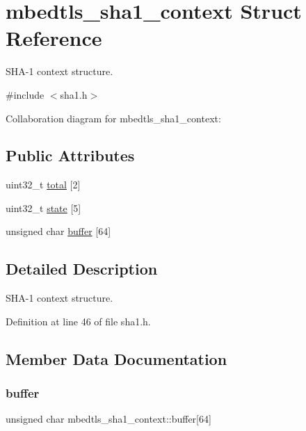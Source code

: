 \hypertarget{structmbedtls__sha1__context}{}\section{mbedtls\+\_\+sha1\+\_\+context Struct Reference}
\label{structmbedtls__sha1__context}


S\+H\+A-\/1 context structure.  




{\ttfamily \#include $<$sha1.\+h$>$}



Collaboration diagram for mbedtls\+\_\+sha1\+\_\+context\+:
\subsection*{Public Attributes}
\begin{DoxyCompactItemize}
\item 
uint32\+\_\+t \mbox{\hyperlink{structmbedtls__sha1__context_a19789ddfacc37f47eb34e26ae718997e}{total}} \mbox{[}2\mbox{]}
\item 
uint32\+\_\+t \mbox{\hyperlink{structmbedtls__sha1__context_af651fef2b175fced6b05aa196fe1f0c8}{state}} \mbox{[}5\mbox{]}
\item 
unsigned char \mbox{\hyperlink{structmbedtls__sha1__context_ae3dcb1efeeb082beb006590a84ef22ec}{buffer}} \mbox{[}64\mbox{]}
\end{DoxyCompactItemize}


\subsection{Detailed Description}
S\+H\+A-\/1 context structure. 

Definition at line 46 of file sha1.\+h.



\subsection{Member Data Documentation}
\mbox{\label{structmbedtls__sha1__context_ae3dcb1efeeb082beb006590a84ef22ec}} 
\subsubsection{\texorpdfstring{buffer}{buffer}}
{\footnotesize\ttfamily unsigned char mbedtls\+\_\+sha1\+\_\+context\+::buffer\mbox{[}64\mbox{]}}

